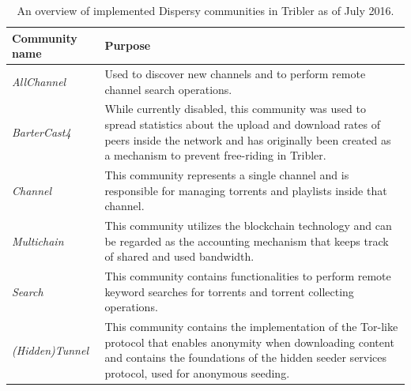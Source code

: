 \begin{table}
	\begin{tabularx}{\textwidth}{|l|X|}
		\hline
		\textbf{Community name} & \textbf{Purpose} \\ \hline
		\emph{AllChannel} & Used to discover new channels and to perform remote channel search operations.\\ \hline
		\emph{BarterCast4} & While currently disabled, this community was used to spread statistics about the upload and download rates of peers inside the network and has originally been created as a mechanism to prevent free-riding in Tribler\cite{meulpolder2009bartercast}.\\ \hline
		\emph{Channel} & This community represents a single channel and is responsible for managing torrents and playlists inside that channel.\\ \hline
		\emph{Multichain} & This community utilizes the blockchain technology and can be regarded as the accounting mechanism that keeps track of shared and used bandwidth.\\ \hline
		\emph{Search} & This community contains functionalities to perform remote keyword searches for torrents and torrent collecting operations.\\ \hline
		\emph{(Hidden)Tunnel} & This community contains the implementation of the Tor-like protocol that enables anonymity when downloading content and contains the foundations of the hidden seeder services protocol, used for anonymous seeding.\\ \hline
	\end{tabularx}
	\caption{An overview of implemented Dispersy communities in Tribler as of July 2016.}
	\label{table:dispersy-communities}
\end{table}

